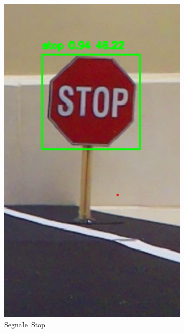 \documentclass{article}
\begin{document}
\begin{figure}[h!]
    \begin{subfigure}[b]{0.3\textwidth}
        \centering
        \includegraphics[width=\linewidth]{stop.png}
        \caption{Segnale Stop}
        \label{fig:stop}
    \end{subfigure}
    \hfill
    \begin{subfigure}[b]{0.3\textwidth}
        \centering

\end{subfigure}
\end{figure}
\end{document}
